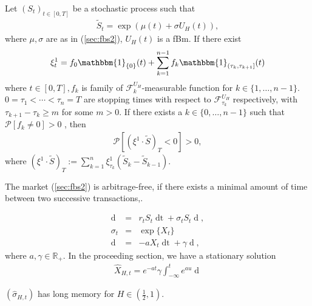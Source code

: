 \documentclass[12pt]{beamer}
\newcommand{\brkt}[1]{\left({#1} \right)}
\begin{document}
\begin{frame}
  \begin{theorem}
  Let $(S_t)_{t\in[0, T]}$ be a stochastic process such that
  \begin{eqnarray}
	\tilde{S}_t = \exp\brkt{\mu(t) + \sigma U_H(t)},
	\label{sec:fbs}
  \end{eqnarray}
  where $\mu, \sigma$ are as in (\ref{sec:fbs2}), $U_H(t)$ is a fBm. If there exist
  \begin{eqnarray*}
  \xi^1_t = f_0\mathbbm{1}_{\{0\}}(t)+\sum_{k=1}^{n-1} f_k \mathbbm{1}_{(\tau_k, \tau_{k+1}]}(t)
  \end{eqnarray*}
  where $t\in[0, T], f_k$ is family of  $\mathcal{F}^{U_H}_k $-measurable function for $k \in \{1,\dots,n-1\}$. $0 = \tau_1 < \cdots <\tau_n = T$ are stopping times with respect to $\mathcal{F}^{U_H}_{\tau_k} $ respectively,  with $\tau_{k+1} - \tau_k\ge m$ for some $m>0$. If there exists a $k \in \{0,\dots,n-1\}$ such that $\mathcal{P}[f_k\neq 0]>0$ , then
  \begin{eqnarray*}
	\mathcal{P}[(\xi^1 \cdot \tilde{S})_T < 0] > 0,
  \end{eqnarray*}
	\label{sec:claim}
	where $(\xi^1 \cdot \tilde{S})_T := \sum_{k=1}^{n} \xi^1_{\tau_k} (\tilde{S}_{k} - \tilde{S}_{k-1})$.
\end{theorem}
\end{frame}

\begin{frame}
   The market (\ref{sec:fbs2}) is arbitrage-free, if there exists a minimal amount of time between two successive transactions,.
\end{frame}

\begin{frame}
\begin{eqnarray}
  \mathop{dS_t} &=& r_tS_t\mathop{dt} + \sigma_t S_t \mathop{dB_t},\\
  \sigma_t &=& \exp\{X_t\} \nonumber\\
  \mathop{dX_t} &=&  -a X_t \mathop{dt} + \gamma \mathop{dU_H(t)},
  \label{sec:fv}
\end{eqnarray}
where $a, \gamma \in \mathbb{R}_{+}$. In the proceeding section, we have a stationary solution 
\begin{eqnarray}
\hat{X}_{H,t}= e^{-at}\gamma\int_{-\infty}^t e^{au}\mathop{dU_H(u)}
\label{sec:fv2}
\end{eqnarray} 
\end{frame}

\begin{frame}
  \begin{theorem}
  $(\hat{\sigma}_{H,t})$ has long memory for $H\in(\frac{1}{2}, 1)$. 
  \end{theorem}
\end{frame}
\end{document}
